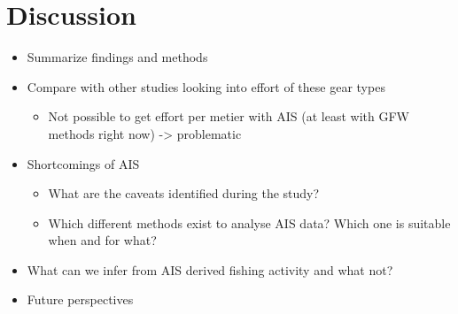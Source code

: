 \chapter{Discussion}

\begin{itemize}
    \item Summarize findings and methods
    \item Compare with other studies looking into effort of these gear types
    \begin{itemize}
        \item Not possible to get effort per metier with AIS (at least with GFW methods right now) -> problematic
    \end{itemize}
    \item Shortcomings of AIS
    \begin{itemize}
        \item What are the caveats identified during the study?
        \item Which different methods exist to analyse AIS data? Which one is suitable when and for what?
    \end{itemize}
    \item What can we infer from AIS derived fishing activity and what not?
    \item Future perspectives
\end{itemize}